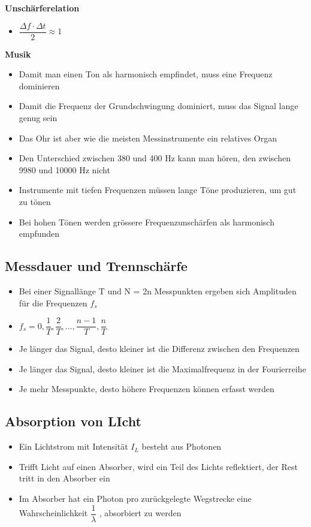 \documentclass[8pt,a4paper]{scrartcl}
\begin{document}
\begin{multicols*}{3}
							\textbf{Unschärferelation}
							\begin{itemize}\itemsep0pt
								\item $\dfrac{\Delta f\cdot \Delta t}{2} \approx 1$
							\end{itemize}	
							
							\textbf{Musik}
							\begin{itemize}\itemsep0pt
								\item Damit man einen Ton als harmonisch empfindet, muss eine Frequenz dominieren
								\item Damit die Frequenz der Grundschwingung dominiert, muss das Signal lange genug sein
								\item Das Ohr ist aber wie die meisten Messinstrumente ein relatives Organ
								\item Den Unterschied zwischen 380 und 400 Hz kann man hören, den zwischen 9980 und 10000 Hz nicht
								\item Instrumente mit tiefen Frequenzen müssen lange Töne produzieren, um gut zu tönen
								\item Bei hohen Tönen werden grössere Frequenzunschärfen als harmonisch empfunden
							\end{itemize}	
							
						\subsection{Messdauer und Trennschärfe}		
							\begin{itemize}\itemsep0pt
								\item Bei einer Signallänge T und N = 2n Messpunkten ergeben sich Amplituden für die Frequenzen $f_{s}$
								\item $f_{s}=0,\dfrac{1}{T},\dfrac{2}{T},...,\dfrac{n-1}{T},\dfrac{n}{T}$
								\item Je länger das Signal, desto kleiner ist die Differenz zwischen den Frequenzen
								\item Je länger das Signal, desto kleiner ist die Maximalfrequenz in der Fourierreihe
								\item Je mehr Messpunkte, desto höhere Frequenzen können erfasst werden
							\end{itemize}	
							
						\subsection{Absorption von LIcht}		
							\begin{itemize}\itemsep0pt
								\item Ein Lichtstrom mit Intensität $I_{L}$ besteht aus Photonen
								\item Trifft Licht auf einen Absorber, wird ein Teil des Lichts reflektiert, der Rest tritt in den Absorber ein
								\item Im Absorber hat ein Photon pro zurückgelegte Wegstrecke eine Wahrscheinlichkeit $\dfrac{1}{\lambda}$ , absorbiert zu werden
							\end{itemize}	
							

\end{multicols*}
\end{document}
